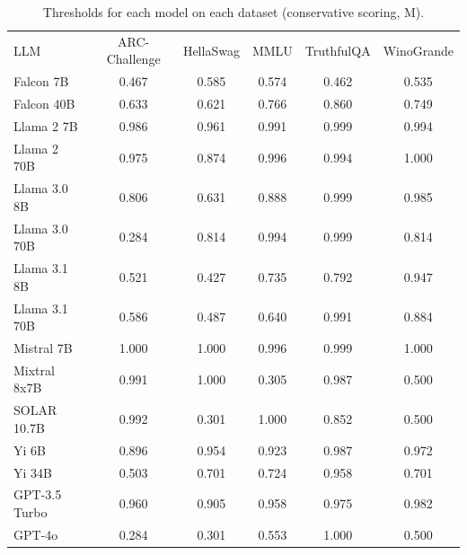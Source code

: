 \begin{table}[h]
\caption{Thresholds for each model on each dataset (conservative scoring, M). }
\label{tab:thresholds_prob_max_k20_w2}
\centering
\begin{tabular}{l S[table-format=3.1] S[table-format=3.1] S[table-format=3.1] S[table-format=3.1] S[table-format=3.1]}
\toprule
LLM & ARC-Challenge & HellaSwag & MMLU & TruthfulQA & WinoGrande \\ 
\cmidrule(lr){1-1} \cmidrule(lr){2-2} \cmidrule(lr){3-3} \cmidrule(lr){4-4} \cmidrule(lr){5-5} \cmidrule(lr){6-6}
Falcon 7B & 0.467 & 0.585 & 0.574 & 0.462 & 0.535\\
Falcon 40B & 0.633 & 0.621 & 0.766 & 0.860 & 0.749\\
Llama 2 7B & 0.986 & 0.961 & 0.991 & 0.999 & 0.994\\
Llama 2 70B & 0.975 & 0.874 & 0.996 & 0.994 & 1.000\\
Llama 3.0 8B & 0.806 & 0.631 & 0.888 & 0.999 & 0.985\\
Llama 3.0 70B & 0.284 & 0.814 & 0.994 & 0.999 & 0.814\\
Llama 3.1 8B & 0.521 & 0.427 & 0.735 & 0.792 & 0.947\\
Llama 3.1 70B & 0.586 & 0.487 & 0.640 & 0.991 & 0.884\\
Mistral 7B & 1.000 & 1.000 & 0.996 & 0.999 & 1.000\\
Mixtral 8x7B & 0.991 & 1.000 & 0.305 & 0.987 & 0.500\\
SOLAR 10.7B & 0.992 & 0.301 & 1.000 & 0.852 & 0.500\\
Yi 6B & 0.896 & 0.954 & 0.923 & 0.987 & 0.972\\
Yi 34B & 0.503 & 0.701 & 0.724 & 0.958 & 0.701\\
GPT-3.5 Turbo & 0.960 & 0.905 & 0.958 & 0.975 & 0.982\\
GPT-4o & 0.284 & 0.301 & 0.553 & 1.000 & 0.500\\
\bottomrule
\end{tabular}
\end{table}
